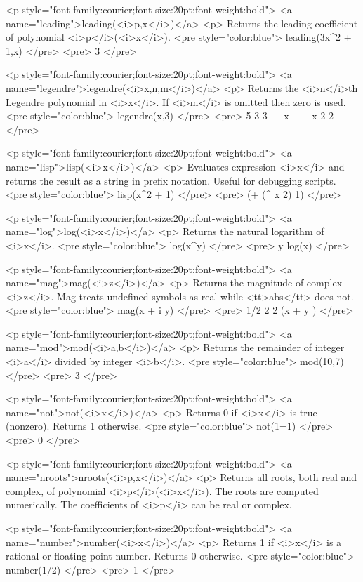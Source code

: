 <p style="font-family:courier;font-size:20pt;font-weight:bold">
<a name="leading">leading(<i>p,x</i>)</a>
<p>
Returns the leading coefficient of polynomial <i>p</i>(<i>x</i>).
<pre style="color:blue">
leading(3x^2 + 1,x)
</pre>
<pre>
3
</pre>

<p style="font-family:courier;font-size:20pt;font-weight:bold">
<a name="legendre">legendre(<i>x,n,m</i>)</a>
<p>
Returns the <i>n</i>th Legendre polynomial in <i>x</i>.
If <i>m</i> is omitted then zero is used.
<pre style="color:blue">
legendre(x,3)
</pre>
<pre>
 5   3    3
--- x  - --- x
 2        2
</pre>

<p style="font-family:courier;font-size:20pt;font-weight:bold">
<a name="lisp">lisp(<i>x</i>)</a>
<p>
Evaluates expression <i>x</i> and returns the result as a
string in prefix notation.
Useful for debugging scripts.
<pre style="color:blue">
lisp(x^2 + 1)
</pre>
<pre>
(+ (^ x 2) 1)
</pre>

<p style="font-family:courier;font-size:20pt;font-weight:bold">
<a name="log">log(<i>x</i>)</a>
<p>
Returns the natural logarithm of <i>x</i>.
<pre style="color:blue">
log(x^y)
</pre>
<pre>
y log(x)
</pre>

<p style="font-family:courier;font-size:20pt;font-weight:bold">
<a name="mag">mag(<i>z</i>)</a>
<p>
Returns the magnitude of complex <i>z</i>.
Mag treats undefined symbols as real while <tt>abs</tt> does not.
<pre style="color:blue">
mag(x + i y)
</pre>
<pre>
         1/2
  2    2
(x  + y )
</pre>

<p style="font-family:courier;font-size:20pt;font-weight:bold">
<a name="mod">mod(<i>a,b</i>)</a>
<p>
Returns the remainder of integer <i>a</i> divided by integer <i>b</i>.
<pre style="color:blue">
mod(10,7)
</pre>
<pre>
3
</pre>

<p style="font-family:courier;font-size:20pt;font-weight:bold">
<a name="not">not(<i>x</i>)</a>
<p>
Returns 0 if <i>x</i> is true (nonzero).
Returns 1 otherwise.
<pre style="color:blue">
not(1=1)
</pre>
<pre>
0
</pre>

<p style="font-family:courier;font-size:20pt;font-weight:bold">
<a name="nroots">nroots(<i>p,x</i>)</a>
<p>
Returns all roots, both real and complex,
of polynomial <i>p</i>(<i>x</i>).
The roots are computed numerically.
The coefficients of <i>p</i> can be real or complex.

<p style="font-family:courier;font-size:20pt;font-weight:bold">
<a name="number">number(<i>x</i>)</a>
<p>
Returns 1 if <i>x</i> is a rational or floating point number.
Returns 0 otherwise.
<pre style="color:blue">
number(1/2)
</pre>
<pre>
1
</pre>

